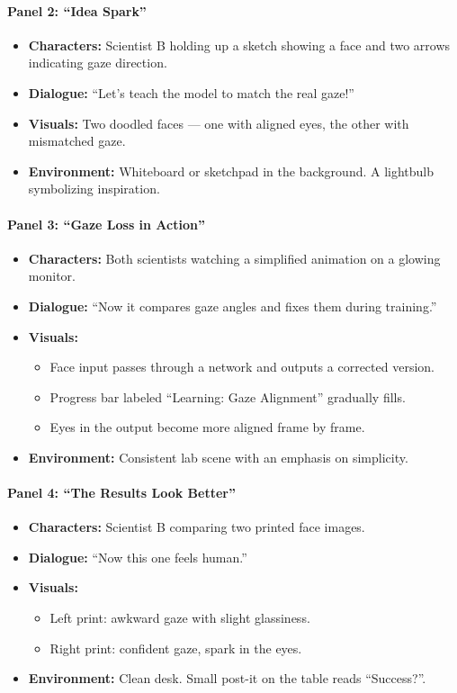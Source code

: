 \paragraph{Panel 2: ``Idea Spark''}
\begin{itemize}
    \item \textbf{Characters:} Scientist B holding up a sketch showing a face and two arrows indicating gaze direction.
    \item \textbf{Dialogue:} ``Let's teach the model to match the real gaze!''
    \item \textbf{Visuals:} Two doodled faces — one with aligned eyes, the other with mismatched gaze.
    \item \textbf{Environment:} Whiteboard or sketchpad in the background. A lightbulb symbolizing inspiration.
\end{itemize}

\paragraph{Panel 3: ``Gaze Loss in Action''}
\begin{itemize}
    \item \textbf{Characters:} Both scientists watching a simplified animation on a glowing monitor.
    \item \textbf{Dialogue:} ``Now it compares gaze angles and fixes them during training.''
    \item \textbf{Visuals:}
    \begin{itemize}
        \item Face input passes through a network and outputs a corrected version.
        \item Progress bar labeled ``Learning: Gaze Alignment'' gradually fills.
        \item Eyes in the output become more aligned frame by frame.
    \end{itemize}
    \item \textbf{Environment:} Consistent lab scene with an emphasis on simplicity.
\end{itemize}

\paragraph{Panel 4: ``The Results Look Better''}
\begin{itemize}
    \item \textbf{Characters:} Scientist B comparing two printed face images.
    \item \textbf{Dialogue:} ``Now this one feels human.''
    \item \textbf{Visuals:}
    \begin{itemize}
        \item Left print: awkward gaze with slight glassiness.
        \item Right print: confident gaze, spark in the eyes.
    \end{itemize}
    \item \textbf{Environment:} Clean desk. Small post-it on the table reads ``Success?''.
\end{itemize}
